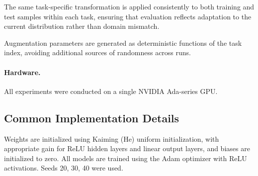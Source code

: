 \documentclass{article}
\begin{document}
The same task-specific transformation is applied consistently to both training and test samples within each task, ensuring that evaluation reflects adaptation to the current distribution rather than domain mismatch.

Augmentation parameters are generated as deterministic functions of the task index, avoiding additional sources of randomness across runs.

\paragraph{Hardware.}
All experiments were conducted on a single NVIDIA Ada-series GPU.

\subsection{Common Implementation Details}
Weights are initialized using Kaiming (He) uniform initialization, with appropriate gain for ReLU hidden layers and linear output layers, and biases are initialized to zero. All models are trained using the Adam optimizer with ReLU activations. Seeds 20, 30, 40 were used.
\end{document}
